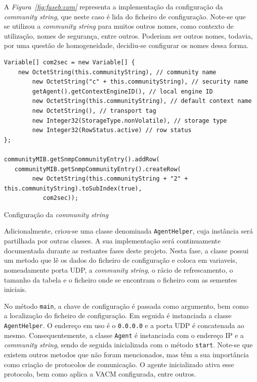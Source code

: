  A  \emph{Figura~\ref{fig:faseb:com}} representa a implementação da configuração
 da \emph{community string}, que neste caso é lida do ficheiro de configuração.
 Note-se que se utilizou a \emph{community string} para muitos outros nomes,
 como contexto de utilização, nomes de segurança, entre outros. Poderiam ser
 outros nomes, todavia, por uma questão de homogeneidade, decidiu-se configurar
 os nomes dessa forma.
\begin{center}
\begin{verbatim}
Variable[] com2sec = new Variable[] { 
	new OctetString(this.communityString), // community name
		new OctetString("c" + this.communityString), // security name
		getAgent().getContextEngineID(), // local engine ID
		new OctetString(this.communityString), // default context name
		new OctetString(), // transport tag
		new Integer32(StorageType.nonVolatile), // storage type
		new Integer32(RowStatus.active) // row status
};

communityMIB.getSnmpCommunityEntry().addRow(
   communityMIB.getSnmpCommunityEntry().createRow(
		new OctetString(this.communityString + "2" + this.communityString).toSubIndex(true), 
           com2sec));
\end{verbatim}
 	\captionsetup{type=figure, width=0.8\linewidth}
	\caption{Configuração da \emph{community string}}
\label{fig:faseb:com} 
\end{center}


Adicionalmente, criou-se uma classe denominada \texttt{AgentHelper}, cuja
instância será partilhada por outras classes. A sua implementação será
continuamente documentada durante as restantes fases deste projeto.
Nesta fase, a classe possui um metodo que lê os dados do ficheiro
de configuração e coloca em variaveis, nomeadamente porta UDP, a \emph{community
string}, o rácio de refrescamento, o tamanho da tabela e o ficheiro onde se
encontram o ficheiro com as sementes iniciais.


No método \texttt{main}, a chave de configuração é passada como argumento, bem
como a localização do ficheiro de configuração.  Em seguida é instanciada
a classe \texttt{AgentHelper}. O endereço em uso é o \texttt{0.0.0.0} e a porta
UDP é concatenada ao mesmo.  Consequentemente, a classe \texttt{Agent}
é instanciada com o endereço IP e a \emph{community string}, sendo de seguida
inicializada com o método \texttt{start}. Note-se que existem outros metodos
que não foram mencionados, mas têm a sua importância como criação de protocolos
de comunicação. O agente inicializado ativa esse protocolo, bem como aplica
a VACM configurada, entre outros.


